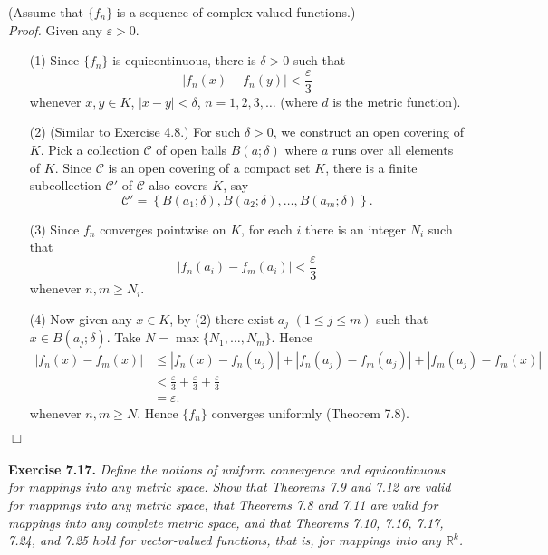 \documentclass{article}
\begin{document}
(Assume that $\{f_n\}$ is a sequence of complex-valued functions.) \\

\emph{Proof.}
Given any $\varepsilon > 0$.
\begin{enumerate}
  \item[(1)]
  Since $\{f_n\}$ is equicontinuous, there is $\delta > 0$ such that
  \[
    |f_n(x) - f_n(y)| < \frac{\varepsilon}{3}
  \]
  whenever $x,y \in K$, $|x-y| < \delta$, $n = 1,2,3,\ldots$
  (where $d$ is the metric function).

  \item[(2)]
  (Similar to Exercise 4.8.)
  For such $\delta > 0$, we construct an open covering of $K$.
  Pick a collection $\mathscr{C}$ of open balls
  $B(a;\delta)$
  where $a$ runs over all elements of $K$.
  Since $\mathscr{C}$ is an open covering of a compact set $K$,
  there is a finite subcollection $\mathscr{C}'$ of $\mathscr{C}$
  also covers $K$, say
  \[
    \mathscr{C}'
    = \left\{B(a_1;\delta), B(a_2;\delta), \ldots, B(a_m;\delta) \right\}.
  \]

  \item[(3)]
  Since $f_n$ converges pointwise on $K$,
  for each $i$ there is an integer $N_i$ such that
  \[
    |f_n(a_i)-f_m(a_i)| < \frac{\varepsilon}{3}
  \]
  whenever $n,m \geq N_i$.

  \item[(4)]
  Now given any $x \in K$, by (2) there exist $a_j$ $(1 \leq j \leq m)$
  such that $x \in B(a_j;\delta)$.
  Take $N = \max\{N_1,\ldots,N_m\}$.
  Hence
  \begin{align*}
    |f_n(x)-f_m(x)|
    &\leq
    |f_n(x)-f_n(a_j)| + |f_n(a_j)-f_m(a_j)| + |f_m(a_j)-f_m(x)| \\
    &<
    \frac{\varepsilon}{3} + \frac{\varepsilon}{3} + \frac{\varepsilon}{3} \\
    &=
    \varepsilon.
  \end{align*}
  whenever $n,m \geq N$.
  Hence $\{f_n\}$ converges uniformly (Theorem 7.8).
\end{enumerate}
$\Box$ \\\\






\textbf{Exercise 7.17.}
\emph{Define the notions of uniform convergence and equicontinuous
for mappings into any metric space.
Show that Theorems 7.9 and 7.12 are valid for mappings into any metric space,
that Theorems 7.8 and 7.11 are valid for mappings into any complete metric space,
and that Theorems 7.10, 7.16, 7.17, 7.24, and 7.25 hold for
vector-valued functions, that is, for mappings into any $\mathbb{R}^k$.} \\
\end{document}
